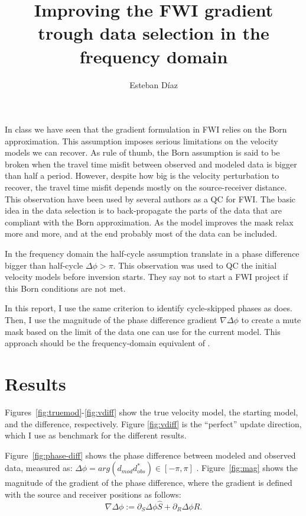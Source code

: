 
\author{Esteban D\'{i}az}
\title{Improving the FWI gradient trough data selection in the frequency domain}

\maketitle

In class we have seen that the gradient formulation in FWI relies on the 
Born approximation. This assumption imposes serious limitations on the velocity
models we can recover. As rule of thumb, the Born assumption is said to be broken
when the travel time misfit between observed and modeled data is bigger than
half a period. However, despite how big is the velocity perturbation to recover,
 the travel time misfit depends mostly on the source-receiver distance. 
This observation have been used by several authors  \citep{liu2014,alejo} as a QC for FWI. The basic idea in 
the data selection is to back-propagate the parts of the data that are
compliant with the Born approximation. As the model improves the mask relax more and more, 
and at the end probably most of the data can be included.

In the frequency domain the half-cycle assumption translate in a phase difference bigger 
than half-cycle $\Delta \phi > \pi$. This observation was used \cite{qa-fwi}
to QC the initial velocity models before inversion starts. They say not to start a FWI 
project if this Born conditions are not met.

In this report, I use the same criterion to identify cycle-skipped phases as \cite{qa-fwi}
does. Then, I use the magnitude of the phase difference gradient $\nabla \Delta \phi$
to create a mute mask based on the limit of the data one can use for the current model. 
 This approach should be the frequency-domain equivalent of \cite{liu2014,alejo}.

\section{Results}
 Figures~\ref{fig:truemod}-\ref{fig:vdiff} show the true velocity model, the starting model,
and the difference, respectively. Figure \ref{fig:vdiff} is the ``perfect'' update direction,
 which I use as benchmark for the different results. 

Figure~\ref{fig:phase-diff} shows the phase difference between modeled and 
observed data, measured as: $\Delta \phi = arg(d_{mod}d_{obs}^*) \in [-\pi,\pi]$ \citep{qa-fwi}.
 Figure~\ref{fig:mag} shows the magnitude of the gradient of the phase difference, where 
the gradient is defined with the source and receiver positions as follows:
\[
\nabla \Delta \phi := \partial_S\Delta\phi  \hat{S} + \partial_R \Delta\phi \hat{R}.
\]

